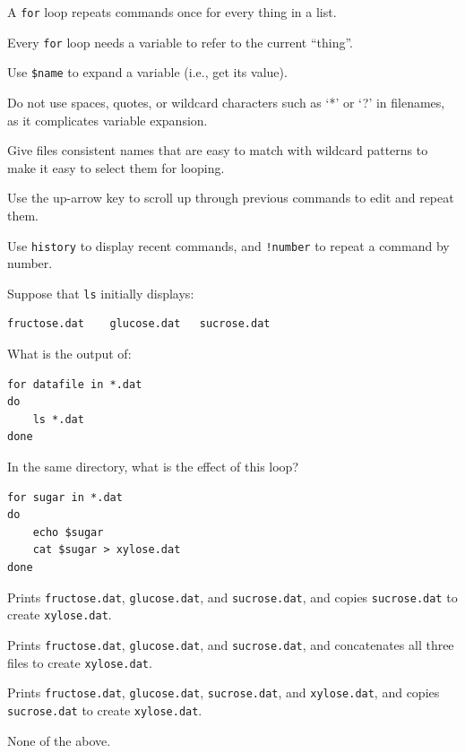 \documentclass{book}
\begin{document}
\begin{keypoints}
\begin{swcitemize}
\item
  A \texttt{for} loop repeats commands once for every thing in a list.
\item
  Every \texttt{for} loop needs a variable to refer to the current
  ``thing''.
\item
  Use \texttt{\$name} to expand a variable (i.e., get its value).
\item
  Do not use spaces, quotes, or wildcard characters such as `*' or `?'
  in filenames, as it complicates variable expansion.
\item
  Give files consistent names that are easy to match with wildcard
  patterns to make it easy to select them for looping.
\item
  Use the up-arrow key to scroll up through previous commands to edit
  and repeat them.
\item
  Use \texttt{history} to display recent commands, and \texttt{!number}
  to repeat a command by number.
\end{swcitemize}
\end{keypoints}

\begin{challenge}
  Suppose that \texttt{ls} initially displays:

\begin{verbatim}
fructose.dat    glucose.dat   sucrose.dat
\end{verbatim}

  What is the output of:

\begin{verbatim}
for datafile in *.dat
do
    ls *.dat
done
\end{verbatim}
\end{challenge}

\begin{challenge}
  In the same directory, what is the effect of this loop?

\begin{verbatim}
for sugar in *.dat
do
    echo $sugar
    cat $sugar > xylose.dat
done
\end{verbatim}

  \begin{swcenumerate}
  \item
    Prints \texttt{fructose.dat}, \texttt{glucose.dat}, and
    \texttt{sucrose.dat}, and copies \texttt{sucrose.dat} to create
    \texttt{xylose.dat}.
  \item
    Prints \texttt{fructose.dat}, \texttt{glucose.dat}, and
    \texttt{sucrose.dat}, and concatenates all three files to create
    \texttt{xylose.dat}.
  \item
    Prints \texttt{fructose.dat}, \texttt{glucose.dat},
    \texttt{sucrose.dat}, and \texttt{xylose.dat}, and copies
    \texttt{sucrose.dat} to create \texttt{xylose.dat}.
  \item
    None of the above.
  \end{swcenumerate}
\end{challenge}
\end{document}
